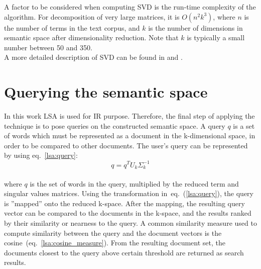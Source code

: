 A factor to be considered when computing \gls{SVD} is the run-time complexity of the algorithm. For decomposition of very large matrices, it is $O(n^2k^3)$, where $n$ is the number of terms in the text corpus, and $k$ is the number of dimensions in semantic space after dimensionality reduction. Note that  $k$ is typically a small number between 50 and 350.\\

A more detailed description of \gls{SVD} can be found in \cite{Berry95usinglinear} and \cite{MatrixCompGolub96}.\\

\section{Querying the semantic space}
\label{lsa:querying_sspace}

In this work \gls{LSA} is used for \gls{IR} purpose. Therefore, the final step of applying the technique is to pose queries on the constructed semantic space. A query $q$ is a set of words which must be represented as a document in the k-dimensional space, in order to be compared to other documents. The user's query can be represented by using eq.~\ref{lsa:query}:
%
%
\begin{equation}
\label{lsa:query}
q = q^{T}U_{k}\Sigma_{k}^{-1}
\end{equation}\\
where $q$ is the set of words in the query, multiplied by the reduced term and singular values matrices. Using the transformation in~eq.~(\ref{lsa:query}), the query is ''mapped'' onto the reduced k-space. After the mapping, the resulting query vector can be compared to the documents in the k-space, and the results ranked by their similarity or nearness to the query. A common similarity measure used to compute similarity between the query and the document vectors is the cosine~(eq.~\ref{lsa:cosine_measure}). From the resulting document set, the documents closest to the query above certain threshold are returned as search results. \\

